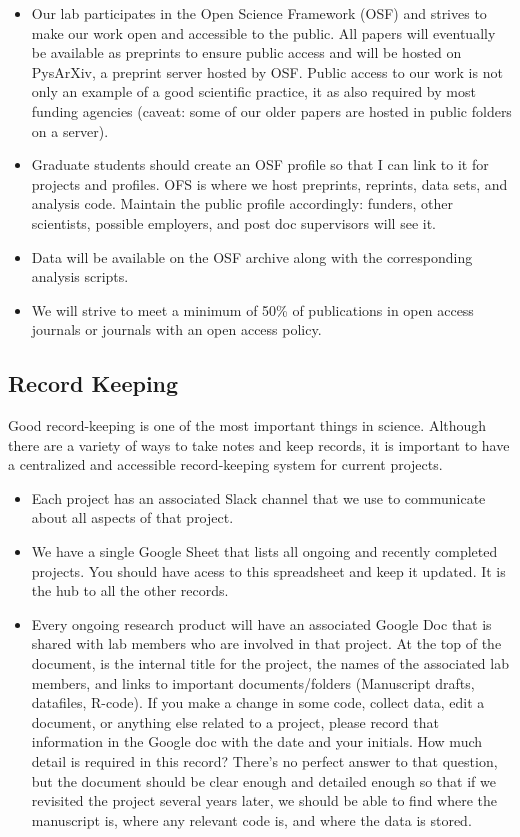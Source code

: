 \documentclass{article}
\begin{document}
\begin{itemize}
\item Our lab participates in the Open Science Framework (OSF) and strives to make our work open and accessible to the public. All papers will eventually be available as preprints to ensure public access and will be hosted on PysArXiv, a preprint server hosted by OSF. Public access to our work is not only an example of a good scientific practice, it as also required by most funding agencies (caveat: some of our older papers are hosted in public folders on a server).
\item Graduate students should create an OSF profile so that I can link to it for projects and profiles. OFS is where we host preprints, reprints, data sets, and analysis code. Maintain the public profile accordingly: funders, other scientists, possible employers, and post doc supervisors will see it. 
\item Data will be available on the OSF archive along with the corresponding analysis scripts. 
\item We will strive to meet a minimum of 50\% of publications in open access journals or journals with an open access policy. 
\end{itemize}

\subsection{Record Keeping} 
Good record-keeping is one of the most important things in science. Although there are a variety of ways to take notes and keep records, it is important to have a centralized and accessible record-keeping system for current projects. 
\begin{itemize}
\item Each project has an associated Slack channel that we use to communicate about all aspects of that project.
\item We have a single Google Sheet that lists all ongoing and recently completed projects. You should have acess to this spreadsheet and keep it updated. It is the hub to all the other records.
\item Every ongoing research product will have an associated Google Doc that is shared with lab members who are involved in that project.  At the top of the document, is the internal title for the project, the names of the associated lab members, and links to important documents/folders (Manuscript drafts, datafiles, R-code). If you make a change in some code, collect data, edit a document, or anything else related to a project, please record that information in the Google doc with the date and your initials. How much detail is required in this record? There's no perfect answer to that question, but the document should be clear enough and detailed  enough so that if we revisited the project several years later, we should be able to find where the manuscript is, where any relevant code is, and where the data is stored. 
\end{itemize}
\end{document}
